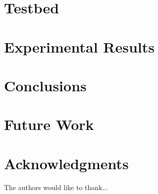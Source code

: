 \documentclass[conference]{IEEEtran}
\begin{document}
\section{Testbed}


\section{Experimental Results}


\section{Conclusions}


\section{Future Work}


\section{Acknowledgments}
The authors would like to thank...




\end{document}
